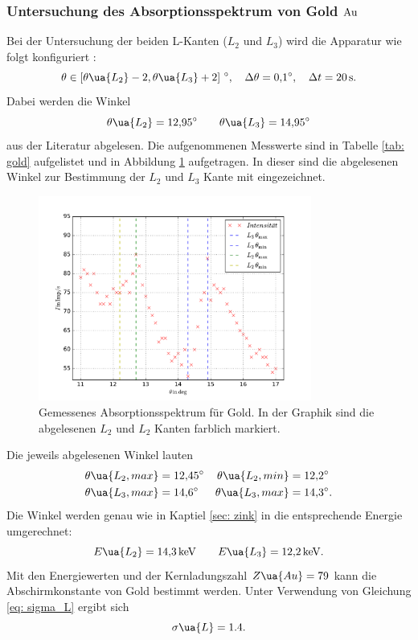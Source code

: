 \subsubsection{Untersuchung des Absorptionsspektrum von Gold $\ce{Au}$}
Bei der Untersuchung der beiden L-Kanten ($L_2$ und $L_3$) wird die Apparatur wie folgt %
konfiguriert \cite{anleitung602}:
\begin{equation*}
  \theta\in\left[\theta\ua{{L_2}}-2,\theta\ua{{L_3}}+2\right]\,\si{\degree},\quad \Delta\theta=\SI{0.1}{\degree}, \quad \Delta t=\SI{20}{\second}. %
\end{equation*}
Dabei werden die Winkel %
\begin{equation*}
  \theta\ua{L_2}=\SI{12.95}{\degree} \qquad  \theta\ua{L_3}=\SI{14.95}{\degree}
\end{equation*}
aus der Literatur \cite{l_kante} abgelesen. %
Die aufgenommenen Messwerte sind in Tabelle \ref{tab: gold} aufgelistet und in Abbildung
\ref{fig: absotp_gold} aufgetragen. In dieser sind die abgelesenen Winkel zur Bestimmung der $L_2$ und $L_3$ Kante mit eingezeichnet.
\begin{figure}
  \centering
  \includegraphics[width=0.8\textwidth]{../Messdaten/gold.pdf}
  \caption{Gemessenes Absorptionsspektrum für Gold. In der Graphik sind die abgelesenen $L_2$ und $L_2$ Kanten farblich markiert.} %
  \label{fig: absotp_gold}
\end{figure}
Die jeweils abgelesenen Winkel lauten
\begin{align*}
  \theta\ua{L_2,max}&=\SI{12.45}{\degree} &   \theta\ua{L_2,min}&=\SI{12.2}{\degree} \\
  \theta\ua{L_3,max}&=\SI{14.6}{\degree} &   \theta\ua{L_3,max}&=\SI{14.3}{\degree}.
\end{align*}
Die Winkel werden genau wie in Kaptiel \ref{sec: zink} in die entsprechende Energie
umgerechnet:
\begin{equation}
  \label{eq:l_kanten_gold}
  E\ua{L_2}=\SI{14.3}{\kilo\eV}  \qquad   E\ua{L_3}=\SI{12.2}{\kilo\eV}.
\end{equation}
Mit den Energiewerten und der Kernladungszahl $Z\ua{Au}=79$ kann die Abschirmkonstante
von Gold bestimmt werden. Unter Verwendung von Gleichung \eqref{eq: sigma_L} ergibt sich
\begin{equation*}
    \sigma\ua{L}=1.4.
\end{equation*}

\FloatBarrier
\FloatBarrier
